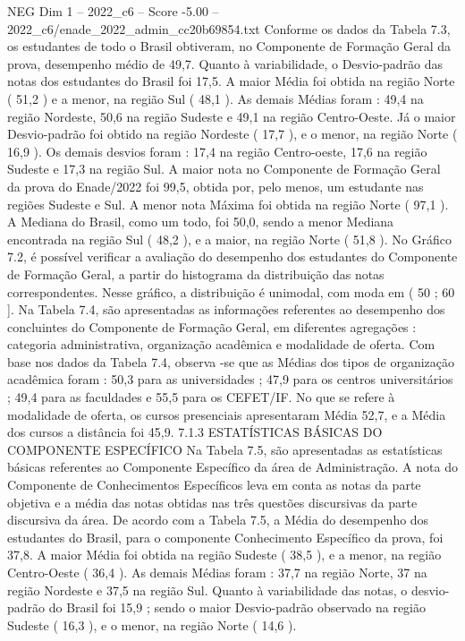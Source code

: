 \begin{textsample}{NEG Dim 1 – 2022\_c6 – Score -5.00 – 2022\_c6/enade\_2022\_admin\_cc20b69854.txt}
Conforme os dados da Tabela 7.3, os estudantes de todo o Brasil obtiveram, no Componente de Formação Geral da prova, desempenho médio de 49,7.
Quanto à variabilidade, o Desvio-padrão das notas dos estudantes do Brasil foi 17,5.
A maior Média foi obtida na região Norte ( 51,2 ) e a menor, na região Sul ( 48,1 ).
As demais Médias foram : 49,4 na região Nordeste, 50,6 na região Sudeste e 49,1 na região Centro-Oeste.
Já o maior Desvio-padrão foi obtido na região Nordeste ( 17,7 ), e o menor, na região Norte ( 16,9 ).
Os demais desvios foram : 17,4 na região Centro-oeste, 17,6 na região Sudeste e 17,3 na região Sul.
A maior nota no Componente de Formação Geral da prova do Enade/2022 foi 99,5, obtida por, pelo menos, um estudante nas regiões Sudeste e Sul.
A menor nota Máxima foi obtida na região Norte ( 97,1 ).
A Mediana do Brasil, como um todo, foi 50,0, sendo a menor Mediana encontrada na região Sul ( 48,2 ), e a maior, na região Norte ( 51,8 ).
No Gráfico 7.2, é possível verificar a avaliação do desempenho dos estudantes do Componente de Formação Geral, a partir do histograma da distribuição das notas correspondentes.
Nesse gráfico, a distribuição é unimodal, com moda em ( 50 ; 60 ].
Na Tabela 7.4, são apresentadas as informações referentes ao desempenho dos concluintes do Componente de Formação Geral, em diferentes agregações : categoria administrativa, organização acadêmica e modalidade de oferta.
Com base nos dados da Tabela 7.4, observa -se que as Médias dos tipos de organização acadêmica foram : 50,3 para as universidades ; 47,9 para os centros universitários ; 49,4 para as faculdades e 55,5 para os CEFET/IF.
No que se refere à modalidade de oferta, os cursos presenciais apresentaram Média 52,7, e a Média dos cursos a distância foi 45,9. 7.1.3 ESTATÍSTICAS BÁSICAS DO COMPONENTE ESPECÍFICO Na Tabela 7.5, são apresentadas as estatísticas básicas referentes ao Componente Específico da área de Administração.
A nota do Componente de Conhecimentos Específicos leva em conta as notas da parte objetiva e a média das notas obtidas nas três questões discursivas da parte discursiva da área.
De acordo com a Tabela 7.5, a Média do desempenho dos estudantes do Brasil, para o componente Conhecimento Específico da prova, foi 37,8.
A maior Média foi obtida na região Sudeste ( 38,5 ), e a menor, na região Centro-Oeste ( 36,4 ).
As demais Médias foram : 37,7 na região Norte, 37 na região Nordeste e 37,5 na região Sul.
Quanto à variabilidade das notas, o desvio-padrão do Brasil foi 15,9 ; sendo o maior Desvio-padrão observado na região Sudeste ( 16,3 ), e o menor, na região Norte ( 14,6 ).

\end{textsample}
